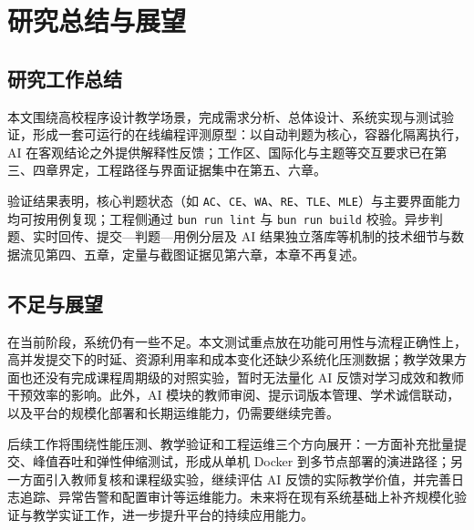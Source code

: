 \chapter{研究总结与展望}

\section{研究工作总结}

本文围绕高校程序设计教学场景，完成需求分析、总体设计、系统实现与测试验证，形成一套可运行的在线编程评测原型：以自动判题为核心，容器化隔离执行，AI 在客观结论之外提供解释性反馈；工作区、国际化与主题等交互要求已在第三、四章界定，工程路径与界面证据集中在第五、六章。

验证结果表明，核心判题状态（如 \texttt{AC}、\texttt{CE}、\texttt{WA}、\texttt{RE}、\texttt{TLE}、\texttt{MLE}）与主要界面能力均可按用例复现；工程侧通过 \texttt{bun run lint} 与 \texttt{bun run build} 校验。异步判题、实时回传、提交—判题—用例分层及 AI 结果独立落库等机制的技术细节与数据流见第四、五章，定量与截图证据见第六章，本章不再复述。

\section{不足与展望}

在当前阶段，系统仍有一些不足。本文测试重点放在功能可用性与流程正确性上，高并发提交下的时延、资源利用率和成本变化还缺少系统化压测数据\cite{alemu2023serverless,kubernetesdocs}；教学效果方面也还没有完成课程周期级的对照实验，暂时无法量化 AI 反馈对学习成效和教师干预效率的影响\cite{ihantola2011automated,messer2024automated}。此外，AI 模块的教师审阅、提示词版本管理、学术诚信联动，以及平台的规模化部署和长期运维能力，仍需要继续完善\cite{lubin2025llm,raihan2025llmcsed,nist201716800190}。

后续工作将围绕性能压测、教学验证和工程运维三个方向展开：一方面补充批量提交、峰值吞吐和弹性伸缩测试，形成从单机 Docker 到多节点部署的演进路径\cite{kubernetesdocs,agache2020firecracker,nist201716800190}；另一方面引入教师复核和课程级实验，继续评估 AI 反馈的实际教学价值，并完善日志追踪、异常告警和配置审计等运维能力。未来将在现有系统基础上补齐规模化验证与教学实证工作，进一步提升平台的持续应用能力。
